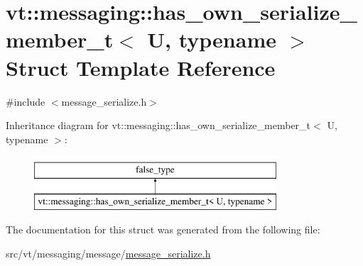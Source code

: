 \hypertarget{structvt_1_1messaging_1_1has__own__serialize__member__t}{}\section{vt\+:\+:messaging\+:\+:has\+\_\+own\+\_\+serialize\+\_\+member\+\_\+t$<$ U, typename $>$ Struct Template Reference}
\label{structvt_1_1messaging_1_1has__own__serialize__member__t}


{\ttfamily \#include $<$message\+\_\+serialize.\+h$>$}

Inheritance diagram for vt\+:\+:messaging\+:\+:has\+\_\+own\+\_\+serialize\+\_\+member\+\_\+t$<$ U, typename $>$\+:\begin{figure}[H]
\begin{center}
\leavevmode
\includegraphics[height=2.000000cm]{structvt_1_1messaging_1_1has__own__serialize__member__t}
\end{center}
\end{figure}


The documentation for this struct was generated from the following file\+:\begin{DoxyCompactItemize}
\item 
src/vt/messaging/message/\hyperlink{message__serialize_8h}{message\+\_\+serialize.\+h}\end{DoxyCompactItemize}
